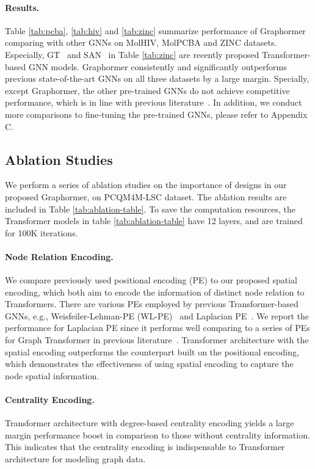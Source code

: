 \documentclass{article}
\begin{document}
\paragraph{Results.} Table \ref{tab:pcba}, \ref{tab:hiv} and \ref{tab:zinc} summarize performance of Graphormer comparing with other GNNs on MolHIV, MolPCBA and ZINC datasets. Especially, GT~\cite{dwivedi2021generalization} and SAN~\cite{Kreuzer2021rethinking} in Table \ref{tab:zinc} are recently proposed Transformer-based GNN models. Graphormer consistently and significantly outperforms previous state-of-the-art GNNs on all three datasets by a large margin. Specially, except Graphormer, the other pre-trained GNNs do not achieve competitive performance, which is in line with previous literature~\cite{hu2020strategies}. In addition, we conduct more comparisons to fine-tuning the pre-trained GNNs, please refer to Appendix C.

\subsection{Ablation Studies}
We perform a series of ablation studies on the importance of designs in our proposed Graphormer, on PCQM4M-LSC dataset. The ablation results are included in Table \ref{tab:ablation-table}. To save the computation resources, the Transformer models in table \ref{tab:ablation-table} have 12 layers, and are trained for 100K iterations.

\paragraph{Node Relation Encoding.} We compare previously used positional encoding (PE) to our proposed spatial encoding, which both aim to encode the information of distinct node relation to Transformers. There are various PEs employed by previous Transformer-based GNNs, e.g., Weisfeiler-Lehman-PE (WL-PE)~\cite{zhang2020graph} and Laplacian PE~\cite{belkin2003laplacian,dwivedi2020benchmarking}. We report the performance for Laplacian PE since it performs well comparing to a series of PEs for Graph Transformer in previous literature~\cite{dwivedi2021generalization}. Transformer architecture with the spatial encoding outperforms the counterpart built on the positional encoding, which demonstrates the effectiveness of using spatial encoding to capture the node spatial information.


\paragraph{Centrality Encoding.} Transformer architecture with degree-based centrality encoding yields a large margin performance boost in comparison to those without centrality information. This indicates that the centrality encoding is indispensable to Transformer architecture for modeling graph data.
\end{document}
